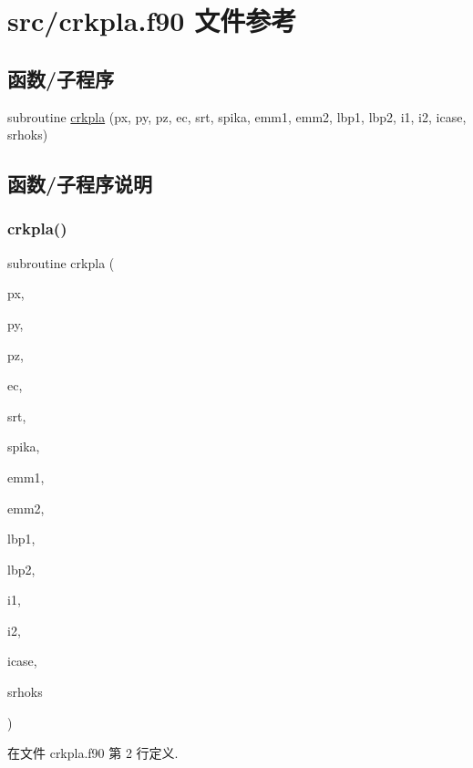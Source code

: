 \hypertarget{crkpla_8f90}{}\section{src/crkpla.f90 文件参考}
\label{crkpla_8f90}
\subsection*{函数/子程序}
\begin{DoxyCompactItemize}
\item 
subroutine \mbox{\hyperlink{crkpla_8f90_a4438f02b1f2301e7f052522e306cb453}{crkpla}} (px, py, pz, ec, srt, spika, emm1, emm2, lbp1, lbp2, i1, i2, icase, srhoks)
\end{DoxyCompactItemize}


\subsection{函数/子程序说明}
\mbox{\label{crkpla_8f90_a4438f02b1f2301e7f052522e306cb453}} 
\subsubsection{\texorpdfstring{crkpla()}{crkpla()}}
{\footnotesize\ttfamily subroutine crkpla (\begin{DoxyParamCaption}\item[{}]{px,  }\item[{}]{py,  }\item[{}]{pz,  }\item[{}]{ec,  }\item[{}]{srt,  }\item[{}]{spika,  }\item[{}]{emm1,  }\item[{}]{emm2,  }\item[{}]{lbp1,  }\item[{}]{lbp2,  }\item[{}]{i1,  }\item[{}]{i2,  }\item[{}]{icase,  }\item[{}]{srhoks }\end{DoxyParamCaption})}



在文件 crkpla.\+f90 第 2 行定义.

